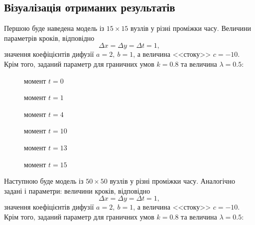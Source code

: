 \documentclass[a4paper,14pt]{extarticle} %
\begin{document}
\subsection*{Візуалізація отриманих результатів}

Першою буде наведена модель із $15\times 15$ вузлів у різні проміжки часу. Величини параметрів кроків, відповідно 
\[ \Delta x=\Delta y=\Delta t=1, \] значення коефіцієнтів дифузії $ a=2,\ b=1 $, а величина <<стоку>> $ c=-10 $. 
Крім того, заданий параметр для граничних умов $k=0.8$ та величина $\lambda=0.5:$

\begin{figure}[H]
    \begin{minipage}[H]{0.49\linewidth}
         момент $t=0$
    \end{minipage}
    \hfill
    \begin{minipage}[H]{0.49\linewidth}
         момент $t=1$
    \end{minipage}
\end{figure}

\begin{figure}[H]
    \begin{minipage}[H]{0.49\linewidth}
         момент $t=4$
    \end{minipage}
    \hfill
    \begin{minipage}[H]{0.49\linewidth}
         момент $t=10$
    \end{minipage}
    \vfill
    \begin{minipage}[H]{0.49\linewidth}
         момент $t=13$
    \end{minipage}
    \hfill
    \begin{minipage}[H]{0.49\linewidth}
         момент $t=15$
    \end{minipage}
\end{figure}

Наступною буде модель із $50\times 50$ вузлів у різні проміжки часу. Аналогічно задані і параметри: величини 
кроків, відповідно \[ \Delta x=\Delta y=\Delta t=1, \] значення коефіцієнтів дифузії $ a=2,\ b=1 $, а 
величина <<стоку>> $ c=-10 $. Крім того, заданий параметр для граничних умов $k=0.8$ та величина $\lambda=0.5:$
\end{document}
